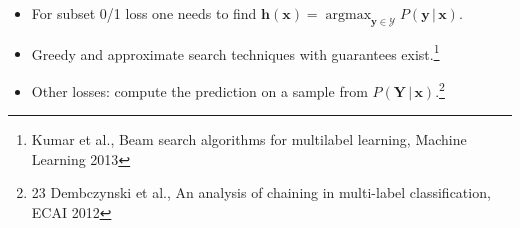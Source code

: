 \documentclass[]{beamer}
\renewcommand{\Pr}{P}
\renewcommand{\vec}[1]{\boldsymbol{#1}}
\newcommand{\given}{\, | \,}
\DeclareMathOperator*{\argmax}{\arg \max}
\newcommand{\bx}{\boldsymbol{x}}
\newcommand{\by}{\boldsymbol{y}}
\newcommand{\bh}{\boldsymbol{h}}
\newcommand{\calY}{\mathcal{Y}}
\begin{document}
\begin{frame}[fragile]
\vspace{-0.4cm}
\begin{itemize}
\item For subset 0/1 loss one needs to find $
\bh(\bx) = \argmax_{\by \in \calY} \Pr(\by \given \bx)
$.
\item Greedy and approximate search techniques with guarantees exist.\footnote{Kumar et al., Beam search algorithms for multilabel
learning, Machine Learning 2013}
\item Other losses: compute the prediction on a sample from $\Pr(\vec{Y} \given  \vec{x})$.\footnote{23 Dembczynski et al., An analysis of chaining
in multi-label classification, ECAI 2012}
\end{itemize}

\end{frame}


%
%
\end{document}
